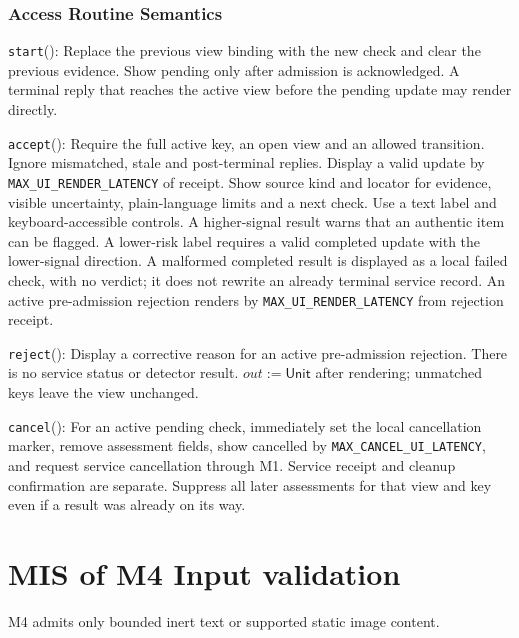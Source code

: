 \documentclass[12pt, titlepage]{article}
\newcommand{\ty}[1]{\textsf{#1}}
\newcommand{\Const}[1]{\texttt{#1}}
\begin{document}
\subsubsection{Access Routine Semantics}

\noindent \texttt{start}():
Replace the previous view binding with the new check and clear the previous evidence. Show pending only after admission is acknowledged. A terminal reply that reaches the active view before the pending update may render directly.

\medskip\noindent \texttt{accept}():
Require the full active key, an open view and an allowed transition. Ignore mismatched, stale and post-terminal replies. Display a valid update by \Const{MAX\_\allowbreak{}UI\_\allowbreak{}RENDER\_\allowbreak{}LATENCY} of receipt. Show source kind and locator for evidence, visible uncertainty, plain-language limits and a next check. Use a text label and keyboard-accessible controls. A higher-signal result warns that an authentic item can be flagged. A lower-risk label requires a valid completed update with the lower-signal direction. A malformed completed result is displayed as a local failed check, with no verdict; it does not rewrite an already terminal service record. An active pre-admission rejection renders by \Const{MAX\_\allowbreak{}UI\_\allowbreak{}RENDER\_\allowbreak{}LATENCY} from rejection receipt.

\medskip\noindent \texttt{reject}():
Display a corrective reason for an active pre-admission rejection. There is no service status or detector result. $out:=\ty{Unit}$ after rendering; unmatched keys leave the view unchanged.

\medskip\noindent \texttt{cancel}():
For an active pending check, immediately set the local cancellation marker, remove assessment fields, show cancelled by \Const{MAX\_\allowbreak{}CANCEL\_\allowbreak{}UI\_\allowbreak{}LATENCY}, and request service cancellation through M1. Service receipt and cleanup confirmation are separate. Suppress all later assessments for that view and key even if a result was already on its way.

\clearpage
\section{MIS of M4 Input validation} \label{sec:m4}

M4 admits only bounded inert text or supported static image content.
\end{document}
